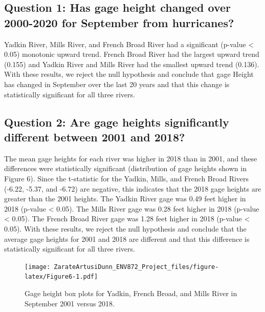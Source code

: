 \documentclass[
  12pt,
]{article}
\begin{document}
\hypertarget{question-1-has-gage-height-changed-over-2000-2020-for-september-from-hurricanes}{%
\subsection{Question 1: Has gage height changed over 2000-2020 for
September from
hurricanes?}\label{question-1-has-gage-height-changed-over-2000-2020-for-september-from-hurricanes}}

Yadkin River, Mills River, and French Broad River had a significant
(p-value \textless{} 0.05) monotonic upward trend. French Broad River
had the largest upward trend (0.155) and Yadkin River and Mills River
had the smallest upward trend (0.136). With these results, we reject the
null hypothesis and conclude that gage Height has changed in September
over the last 20 years and that this change is statistically significant
for all three rivers.

\hypertarget{question-2-are-gage-heights-significantly-different-between-2001-and-2018}{%
\subsection{Question 2: Are gage heights significantly different between
2001 and
2018?}\label{question-2-are-gage-heights-significantly-different-between-2001-and-2018}}

The mean gage heights for each river was higher in 2018 than in 2001,
and these differences were statistically significant (distribution of
gage heights shown in Figure 6). Since the t-statistic for the Yadkin,
Mills, and French Broad Rivers (-6.22, -5.37, and -6.72) are negative,
this indicates that the 2018 gage heights are greater than the 2001
heights. The Yadkin River gage was 0.49 feet higher in 2018 (p-value
\textless{} 0.05). The Mills River gage was 0.28 feet higher in 2018
(p-value \textless{} 0.05). The French Broad River gage was 1.28 feet
higher in 2018 (p-value \textless{} 0.05). With these results, we reject
the null hypothesis and conclude that the average gage heights for 2001
and 2018 are different and that this difference is statistically
significant for all three rivers.

\begin{figure}
\centering
\texttt{[image: ZarateArtusiDunn\_ENV872\_Project\_files/figure-latex/Figure6-1.pdf]}
\caption{Gage height box plots for Yadkin, French Broad, and Mills River
in September 2001 versus 2018.}
\end{figure}
\end{document}
